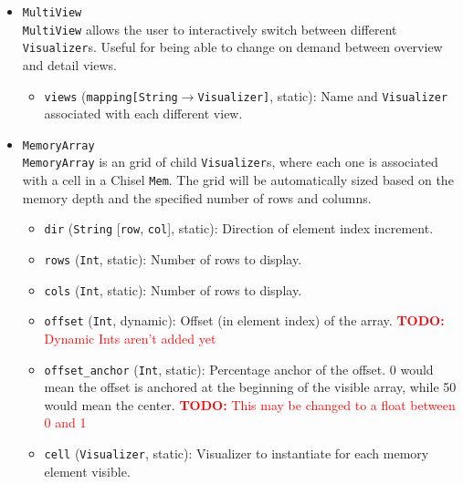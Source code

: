 \documentclass[11pt]{article}
\newcommand{\todo}[1]{\textcolor{red}{\textbf{TODO:} #1}}
\begin{document}
\begin{itemize}
  \todo{Add a picture to describe this concept}
  \begin{itemize}
    \item \texttt{dir} (\texttt{String} [\texttt{row}, \texttt{col}], static): Whether cells are arranged left to right (\texttt{row}) or top to bottom (\texttt{col}).
    \item \texttt{cells} (\texttt{list[Visualizer]}, static): Children \texttt{Visualizers} to arrange in a line.
  \end{itemize}  
  \item \texttt{MultiView} \\
  \texttt{MultiView} allows the user to interactively switch between different \texttt{Visualizer}s. Useful for being able to change on demand between overview and detail views.
  \begin{itemize}
    \item \texttt{views} (\texttt{mapping[String$\rightarrow$Visualizer]}, static): Name and \texttt{Visualizer} associated with each different view.
  \end{itemize}
  \item \texttt{MemoryArray} \\
  \texttt{MemoryArray} is an grid of child \texttt{Visualizer}s, where each one is associated with a cell in a Chisel \texttt{Mem}. The grid will be automatically sized based on the memory depth and the specified number of rows and columns.
  \begin{itemize}
    \item \texttt{dir} (\texttt{String} [\texttt{row}, \texttt{col}], static): Direction of element index increment.
    \item \texttt{rows} (\texttt{Int}, static): Number of rows to display.
    \item \texttt{cols} (\texttt{Int}, static): Number of rows to display.
    \item \texttt{offset} (\texttt{Int}, dynamic): Offset (in element index) of the array. \todo{Dynamic Ints aren't added yet}
    \item \texttt{offset\_anchor} (\texttt{Int}, static): Percentage anchor of the offset. 0 would mean the offset is anchored at the beginning of the visible array, while 50 would mean the center. \todo{This may be changed to a float between 0 and 1}
    \item \texttt{cell} (\texttt{Visualizer}, static): Visualizer to instantiate for each memory element visible.
  \end{itemize}
\end{itemize}
\end{document}
